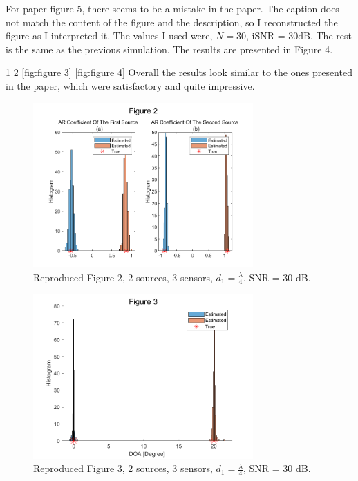 \documentclass{article}
\begin{document}
For paper figure 5, there seems to be a mistake in the paper. The caption does not match the content of the figure and the description, so I reconstructed the figure as I interpreted it.
The values I used were, $N=30$, iSNR = 30dB.
The rest is the same as the previous simulation.
The results are presented in Figure 4.

\ref*{fig:figure 1} \ref*{fig:figure 2} \ref*{fig:figure 3} \ref*{fig:figure 4}
Overall the results look similar to the ones presented in the paper, which were satisfactory and quite impressive.


\begin{figure}[htbp]
    \centerline{
    \includegraphics[width=0.75\textwidth]{Fig2.png}}
    \caption{Reproduced Figure 2, 2 sources, 3 sensors, $d_1 = \frac{\lambda}{4}$, SNR = 30 dB.}
    \label{fig:figure 1}
\end{figure}


\begin{figure}[htbp]
    \centerline{
    \includegraphics[width=0.75\textwidth]{Fig3.png}}
    \caption{Reproduced Figure 3, 2 sources, 3 sensors, $d_1 = \frac{\lambda}{4}$, SNR = 30 dB.}
    \label{fig:figure 2}
\end{figure}
\end{document}
